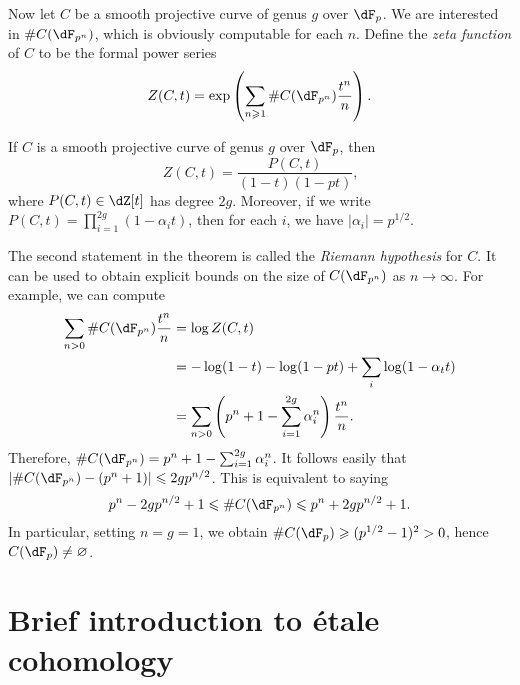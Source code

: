 \documentclass{article}
\begin{document}
Now let $C$ be a smooth projective curve of genus $g$ over $\dF_p$. 
We are interested in $\#C(\dF_{p^n})$, which is obviously computable 
for each $n$. Define the \emph{zeta function} of $C$ to be the formal power 
series 
\[
  Z(C,t) = \exp\left( \sum_{n\geqslant 1} \# C(\dF_{p^n}) \frac{t^n}{n} \right) \text{.}
\]

\begin{theorem}[Weil]\label{thm:Weil-curve}
If $C$ is a smooth projective curve of genus $g$ over $\dF_p$, then 
\[
  Z(C,t) = \frac{P(C,t)}{(1-t)(1-p t)} \text{,}
\]
where $P(C,t)\in \dZ[t]$ has degree $2 g$. Moreover, if we write
$P(C,t) = \prod_{i=1}^{2 g} (1-\alpha_i t)$, then for each $i$, we have 
$|\alpha_i|=p^{1/2}$. 
\end{theorem}

The second statement in the theorem is called the \emph{Riemann hypothesis} 
for $C$. It can be used to obtain explicit bounds on the size of 
$C(\dF_{p^n})$ as $n\to\infty$. For example, we can compute 
\begin{align*}
  \sum_{n>0} \# C(\dF_{p^n}) \frac{t^n}{n} 
    &= \log Z(C,t) \\
    &= -\log(1-t) - \log(1-p t) + \sum_i \log(1-\alpha_t t) \\
    &= \sum_{n>0} \left(p^n+1-\sum_{i=1}^{2 g} \alpha_i^n\right) \frac{t^n}{n} \text{.}
\end{align*}
Therefore, $\# C(\dF_{p^n}) = p^n+1-\sum_{i=1}^{2 g} \alpha_i^n$. It 
follows easily that $|\# C(\dF_{p^n})-(p^n+1)| \leqslant 2 g p^{n/2}$. 
This is equivalent to saying 
\[
  p^n-2 g p^{n/2}+1 
    \leqslant \# C(\dF_{p^n}) 
    \leqslant p^n + 2 g p^{n/2} + 1 \text{.}
\]
In particular, setting $n = g = 1$, we obtain 
$\# C(\dF_p) \geqslant (p^{1/2}-1)^2>0$, hence 
$C(\dF_p)\ne\varnothing$. 

























\appendix
\section{Brief introduction to \'etale cohomology}
\end{document}
